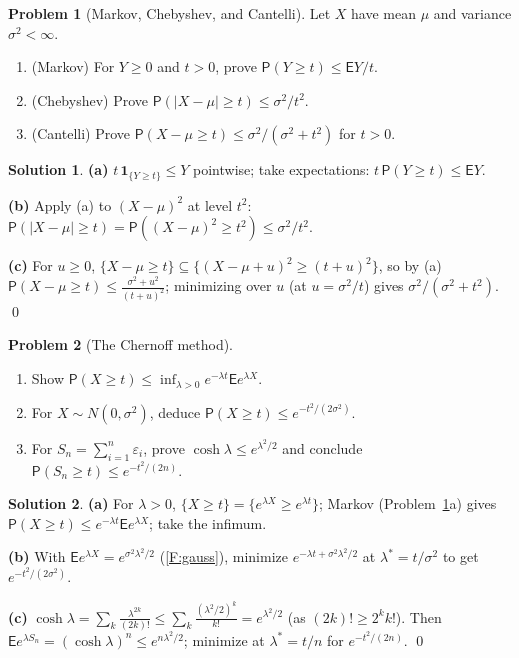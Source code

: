 \documentclass[12pt,a4paper]{article}
\theoremstyle{definition}
\newtheorem{exercise}{Problem}
\newtheorem*{solution*}{Solution}
\newcommand\expc{\mathsf{E}}
\newcommand\prb{\mathsf{P}}
\begin{document}
\begin{exercise}[Markov, Chebyshev, and Cantelli]\label{prob:markov}
Let $X$ have mean $\mu$ and variance $\sigma^2<\infty$.
\begin{enumerate}[label=(\alph*)]
\item (Markov) For $Y\ge0$ and $t>0$, prove $\prb(Y\ge t)\le\expc Y/t$.
\item (Chebyshev) Prove $\prb(|X-\mu|\ge t)\le\sigma^2/t^2$.
\item (Cantelli) Prove $\prb(X-\mu\ge t)\le\sigma^2/(\sigma^2+t^2)$ for $t>0$.
\end{enumerate}
\end{exercise}
\begin{solution*}
\textbf{(a)} $t\,\mathbf 1_{\{Y\ge t\}}\le Y$ pointwise; take expectations: $t\,\prb(Y\ge t)\le\expc Y$.

\textbf{(b)} Apply (a) to $(X-\mu)^2$ at level $t^2$: $\prb(|X-\mu|\ge t)=\prb((X-\mu)^2\ge t^2)\le\sigma^2/t^2$.

\textbf{(c)} For $u\ge0$, $\{X-\mu\ge t\}\subseteq\{(X-\mu+u)^2\ge(t+u)^2\}$, so by (a) $\prb(X-\mu\ge t)\le\tfrac{\sigma^2+u^2}{(t+u)^2}$; minimizing over $u$ (at $u=\sigma^2/t$) gives $\sigma^2/(\sigma^2+t^2)$. \qed
\end{solution*}

\begin{exercise}[The Chernoff method]\label{prob:chernoff}
\begin{enumerate}[label=(\alph*)]
\item Show $\prb(X\ge t)\le\inf_{\lambda>0}e^{-\lambda t}\expc e^{\lambda X}$.
\item For $X\sim N(0,\sigma^2)$, deduce $\prb(X\ge t)\le e^{-t^2/(2\sigma^2)}$.
\item For $S_n=\sum_{i=1}^n\varepsilon_i$, prove $\cosh\lambda\le e^{\lambda^2/2}$ and conclude $\prb(S_n\ge t)\le e^{-t^2/(2n)}$.
\end{enumerate}
\end{exercise}
\begin{solution*}
\textbf{(a)} For $\lambda>0$, $\{X\ge t\}=\{e^{\lambda X}\ge e^{\lambda t}\}$; Markov (Problem~\ref{prob:markov}a) gives $\prb(X\ge t)\le e^{-\lambda t}\expc e^{\lambda X}$; take the infimum.

\textbf{(b)} With $\expc e^{\lambda X}=e^{\sigma^2\lambda^2/2}$ (\ref{F:gauss}), minimize $e^{-\lambda t+\sigma^2\lambda^2/2}$ at $\lambda^*=t/\sigma^2$ to get $e^{-t^2/(2\sigma^2)}$.

\textbf{(c)} $\cosh\lambda=\sum_k\tfrac{\lambda^{2k}}{(2k)!}\le\sum_k\tfrac{(\lambda^2/2)^k}{k!}=e^{\lambda^2/2}$ (as $(2k)!\ge2^kk!$). Then $\expc e^{\lambda S_n}=(\cosh\lambda)^n\le e^{n\lambda^2/2}$; minimize at $\lambda^*=t/n$ for $e^{-t^2/(2n)}$. \qed
\end{solution*}
\end{document}
